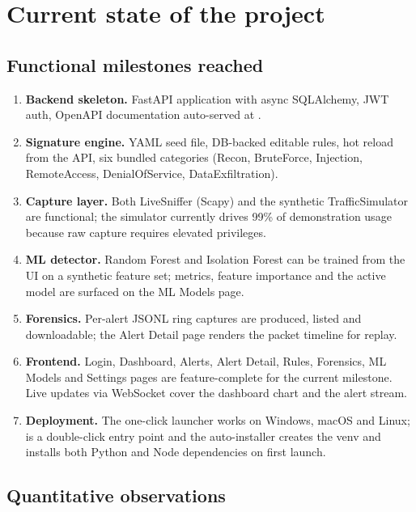 \section{Current state of the project}
\label{sec:current_state}

\subsection{Functional milestones reached}

\begin{enumerate}
    \item \textbf{Backend skeleton.} FastAPI application with async
        SQLAlchemy, JWT auth, OpenAPI documentation auto-served at
        .
    \item \textbf{Signature engine.} YAML seed file, DB-backed
        editable rules, hot reload from the API, six bundled
        categories (Recon, BruteForce, Injection, RemoteAccess,
        DenialOfService, DataExfiltration).
    \item \textbf{Capture layer.} Both LiveSniffer (Scapy) and the
        synthetic TrafficSimulator are functional; the simulator
        currently drives 99\% of demonstration usage because raw
        capture requires elevated privileges.
    \item \textbf{ML detector.} Random Forest and Isolation Forest can
        be trained from the UI on a synthetic feature set; metrics,
        feature importance and the active model are surfaced on the
        ML Models page.
    \item \textbf{Forensics.} Per-alert JSONL ring captures are
        produced, listed and downloadable; the Alert Detail page
        renders the packet timeline for replay.
    \item \textbf{Frontend.} Login, Dashboard, Alerts, Alert Detail,
        Rules, Forensics, ML Models and Settings pages are
        feature-complete for the current milestone. Live updates via
        WebSocket cover the dashboard chart and the alert stream.
    \item \textbf{Deployment.} The one-click launcher works on
        Windows, macOS and Linux;  is a double-click
        entry point and the auto-installer creates the venv and
        installs both Python and Node dependencies on first launch.
\end{enumerate}

\subsection{Quantitative observations}


